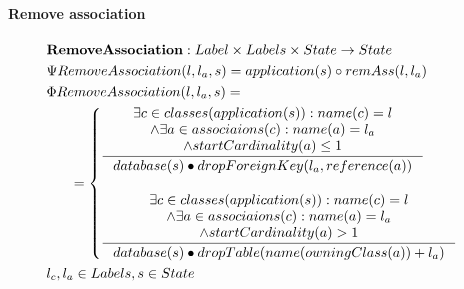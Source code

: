 \documentclass[11pt]{article}
\begin{document}
\paragraph{Remove association} 
\begin{align*}
&    \mathbf{RemoveAssociation} : Label \times Labels \times State \rightarrow State \\ 
&    \Psi RemoveAssociation(l, l_a, s) = application(s) \circ remAss(l, l_a) \\
&    \Phi RemoveAssociation(l, l_a, s) = \\
& \;\;\;\;\;\; =\begin{cases}
     	\inference{\exists c \in classes(application(s)) : name(c) = l \\
     	\wedge \exists a \in associaions(c) : name(a) = l_a  \\
     	\wedge startCardinality(a) \leq 1 \\}{database(s) \bullet dropForeignKey(l_a, reference(a))} \\\\
     	\inference{\exists c \in classes(application(s)) : name(c) = l \\
     	\wedge \exists a \in associaions(c) : name(a) = l_a  \\
     	\wedge startCardinality(a) > 1}{database(s) \bullet dropTable(name(owningClass(a))+l_a)} 
     \end{cases}\\
&    l_c, l_a \in Labels, s \in State
\end{align*}
\end{document}
